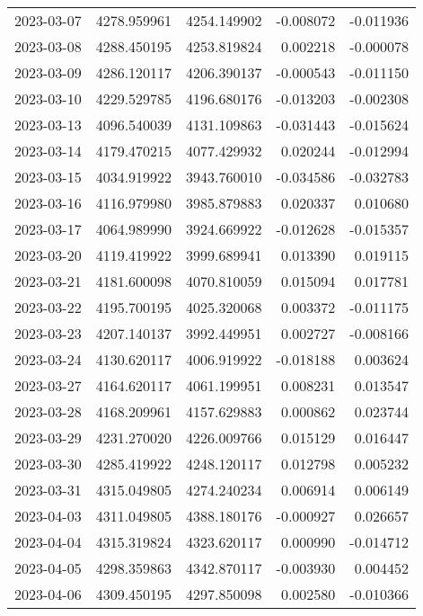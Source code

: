 \begin{tabular}{lrrrr}
2023-03-07 & 4278.959961 & 4254.149902 &       -0.008072 &    -0.011936 \\
2023-03-08 & 4288.450195 & 4253.819824 &        0.002218 &    -0.000078 \\
2023-03-09 & 4286.120117 & 4206.390137 &       -0.000543 &    -0.011150 \\
2023-03-10 & 4229.529785 & 4196.680176 &       -0.013203 &    -0.002308 \\
2023-03-13 & 4096.540039 & 4131.109863 &       -0.031443 &    -0.015624 \\
2023-03-14 & 4179.470215 & 4077.429932 &        0.020244 &    -0.012994 \\
2023-03-15 & 4034.919922 & 3943.760010 &       -0.034586 &    -0.032783 \\
2023-03-16 & 4116.979980 & 3985.879883 &        0.020337 &     0.010680 \\
2023-03-17 & 4064.989990 & 3924.669922 &       -0.012628 &    -0.015357 \\
2023-03-20 & 4119.419922 & 3999.689941 &        0.013390 &     0.019115 \\
2023-03-21 & 4181.600098 & 4070.810059 &        0.015094 &     0.017781 \\
2023-03-22 & 4195.700195 & 4025.320068 &        0.003372 &    -0.011175 \\
2023-03-23 & 4207.140137 & 3992.449951 &        0.002727 &    -0.008166 \\
2023-03-24 & 4130.620117 & 4006.919922 &       -0.018188 &     0.003624 \\
2023-03-27 & 4164.620117 & 4061.199951 &        0.008231 &     0.013547 \\
2023-03-28 & 4168.209961 & 4157.629883 &        0.000862 &     0.023744 \\
2023-03-29 & 4231.270020 & 4226.009766 &        0.015129 &     0.016447 \\
2023-03-30 & 4285.419922 & 4248.120117 &        0.012798 &     0.005232 \\
2023-03-31 & 4315.049805 & 4274.240234 &        0.006914 &     0.006149 \\
2023-04-03 & 4311.049805 & 4388.180176 &       -0.000927 &     0.026657 \\
2023-04-04 & 4315.319824 & 4323.620117 &        0.000990 &    -0.014712 \\
2023-04-05 & 4298.359863 & 4342.870117 &       -0.003930 &     0.004452 \\
2023-04-06 & 4309.450195 & 4297.850098 &        0.002580 &    -0.010366 \\

\end{tabular}
